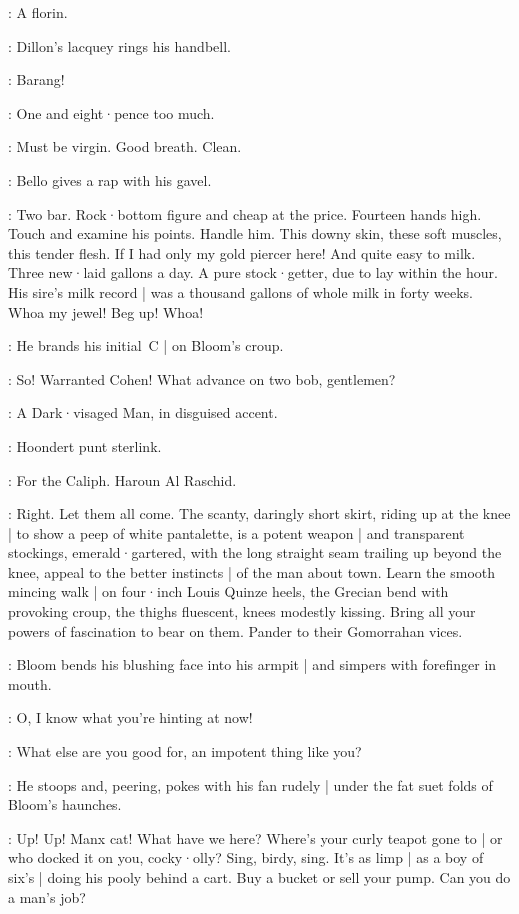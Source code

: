 \Bidder:
A florin.

:
Dillon's lacquey rings his handbell.

\Lacquey:
Barang!

\Voice:
One and eight·pence too much.

\Marsh[2]:
Must be virgin.
Good breath.
Clean.

:
Bello gives a rap with his gavel.

\Bello:
Two bar.
Rock·bottom figure and cheap at the price.
Fourteen hands high.
Touch and examine his points.
Handle him.
This downy skin,
these soft muscles,
this tender flesh.
If I had only my gold piercer here!
And quite easy to milk.
Three new·laid gallons a day.
A pure stock·getter,
due to lay within the hour.
His sire's milk record |
was a thousand gallons of whole milk in forty weeks.
Whoa my jewel!
Beg up!
Whoa!

:
He brands his initial~C |
on Bloom's croup.

\Bello:
So!
Warranted Cohen!
What advance on two bob,
gentlemen?

:
A Dark·visaged Man,
in disguised accent.

\DarkvisagedMan:
Hoondert punt sterlink.

\Voices:
For the Caliph.
Haroun Al Raschid.

\Bello:
Right.
Let them all come.
The scanty,
daringly short skirt,
riding up at the knee |
to show a peep of white pantalette,
is a potent weapon |
and transparent stockings,
emerald·gartered,
with the long straight seam trailing up beyond the knee,
appeal to the better instincts |
of the  man about town.
Learn the smooth mincing walk |
on four·inch Louis Quinze heels,
the Grecian bend with provoking croup,
%
the thighs fluescent,
knees modestly kissing.
Bring all your powers of fascination to bear on them.
Pander to their Gomorrahan vices.

:
Bloom bends his blushing face into his armpit |
and simpers with forefinger in mouth.

\Bloom:
O,
I know what you're hinting at now!

\Bello:
What else are you good for,
an impotent thing like you?

:
He stoops and,
peering,
pokes with his fan rudely |
under the fat suet folds of Bloom's haunches.

\Bello:
Up!
Up!
Manx cat!
What have we here?
Where's your curly teapot gone to |
or who docked it on you,
cocky·olly?
Sing,
birdy,
sing.
%
It's as limp |
as a boy of six's |
doing his pooly behind a cart.
Buy a bucket or sell your pump.
Can you do a man's job?


